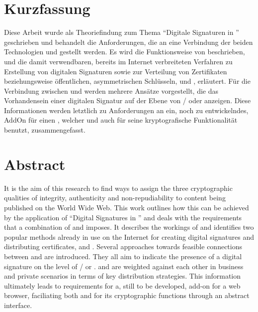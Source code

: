

\noindent
\begin{minipage}{\textwidth}
\chapter*{Kurzfassung}
Diese Arbeit wurde als Theoriefindung zum Thema ``Digitale Signaturen in '' geschrieben und behandelt die Anforderungen, die an eine Verbindung
der beiden Technologien  und  gestellt werden. Es wird die Funktionsweise von  beschrieben, und die damit
verwendbaren, bereits im Internet verbreiteten Verfahren zu Erstellung von digitalen Signaturen sowie zur Verteilung von Zertifikaten beziehungsweise
öffentlichen, asymmetrischen Schlüsseln,  und , erläutert. Für die Verbindung zwischen  und
 werden mehrere Ansätze vorgestellt, die das Vorhandensein einer digitalen Signatur auf der Ebene von / oder
 anzeigen. Diese Informationen werden letztlich zu Anforderungen an ein, noch zu entwickelndes, AddOn für einen , welcher
 und auch  für seine kryptografische Funktionalität benutzt, zusammengefasst.

\chapter*{Abstract}
It is the aim of this research to find ways to assign the three cryptographic qualities of integrity, authenticity and non-repudiability to content being published
on the World Wide Web. This work outlines how this can be achieved by the application of "`Digital Signatures in "' and deals with the requirements 
that a combination of  and  imposes. It describes the workings of  and identifies two popular methods
already in use on the Internet for creating digital signatures and distributing certificates,  and .
Several approaches towards feasible connections between  and  are introduced. They all aim to indicate the presence of a
digital signature on the level of / or .  and  are weighted against each other
in business and private scenarios in terms of key distribution strategies. This information ultimately leads to requirements for a, still to be developed,
add-on for a web browser, faciliating both  and  for its cryptographic functions through an abstract interface.

\end{minipage}
